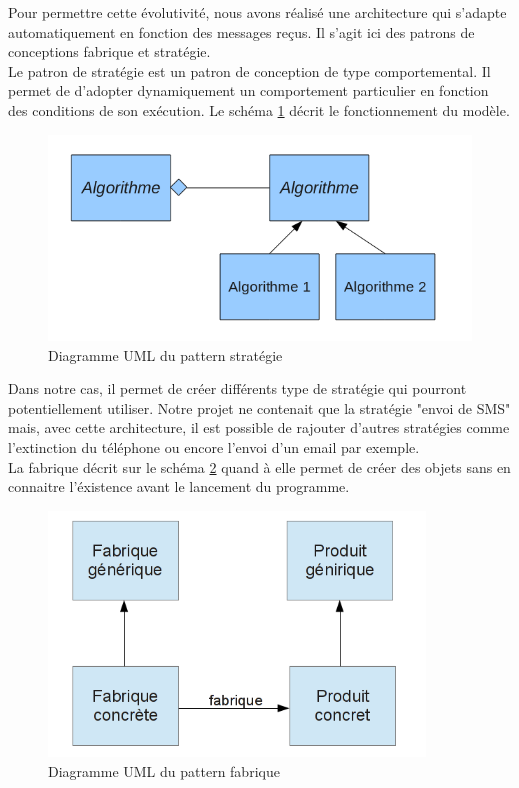 Pour permettre cette évolutivité, nous avons réalisé une architecture qui s'adapte automatiquement en
fonction des messages reçus. Il s'agit ici des patrons de conceptions fabrique et stratégie. 
\\


Le patron de stratégie est un patron de conception de type comportemental. Il permet de d'adopter 
dynamiquement un comportement particulier en fonction des conditions de son exécution. Le schéma 
\ref{pattern_strategie} décrit le fonctionnement du modèle.

\begin{figure}[H]
	\center
	\includegraphics[width=12cm]{img/pattern_strategie.png}
	\caption{Diagramme UML du pattern stratégie}
	\label{pattern_strategie}
\end{figure}

Dans notre cas, il permet de créer différents type de stratégie qui pourront potentiellement utiliser. 
Notre projet ne contenait que la stratégie "envoi de SMS" mais, avec cette architecture, il est possible 
de rajouter d'autres stratégies comme l'extinction du téléphone ou encore l'envoi d'un email par exemple.
\\


La fabrique décrit sur le schéma \ref{fabrique} quand à elle permet de créer des objets sans en connaitre l'éxistence avant le lancement du programme.

\begin{figure}[H]
	\center
	\includegraphics[width=10cm]{img/fabrique.png}
	\caption{Diagramme UML du pattern fabrique}
	\label{fabrique}
\end{figure}

